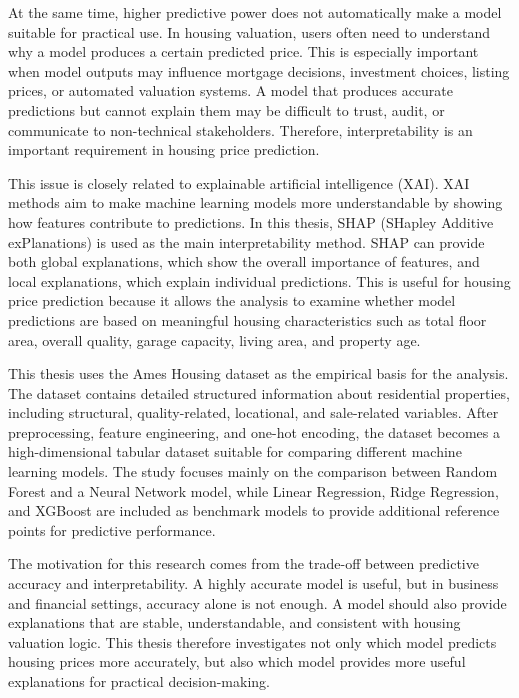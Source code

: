 \documentclass[12pt,a4paper,oneside,openany]{book}
\begin{document}
At the same time, higher predictive power does not automatically make a model suitable for practical use. In housing valuation, users often need to understand why a model produces a certain predicted price. This is especially important when model outputs may influence mortgage decisions, investment choices, listing prices, or automated valuation systems. A model that produces accurate predictions but cannot explain them may be difficult to trust, audit, or communicate to non-technical stakeholders. Therefore, interpretability is an important requirement in housing price prediction.

This issue is closely related to explainable artificial intelligence (XAI). XAI methods aim to make machine learning models more understandable by showing how features contribute to predictions. In this thesis, SHAP (SHapley Additive exPlanations) is used as the main interpretability method. SHAP can provide both global explanations, which show the overall importance of features, and local explanations, which explain individual predictions. This is useful for housing price prediction because it allows the analysis to examine whether model predictions are based on meaningful housing characteristics such as total floor area, overall quality, garage capacity, living area, and property age.

This thesis uses the Ames Housing dataset as the empirical basis for the analysis. The dataset contains detailed structured information about residential properties, including structural, quality-related, locational, and sale-related variables. After preprocessing, feature engineering, and one-hot encoding, the dataset becomes a high-dimensional tabular dataset suitable for comparing different machine learning models. The study focuses mainly on the comparison between Random Forest and a Neural Network model, while Linear Regression, Ridge Regression, and XGBoost are included as benchmark models to provide additional reference points for predictive performance.

The motivation for this research comes from the trade-off between predictive accuracy and interpretability. A highly accurate model is useful, but in business and financial settings, accuracy alone is not enough. A model should also provide explanations that are stable, understandable, and consistent with housing valuation logic. This thesis therefore investigates not only which model predicts housing prices more accurately, but also which model provides more useful explanations for practical decision-making.
\end{document}
